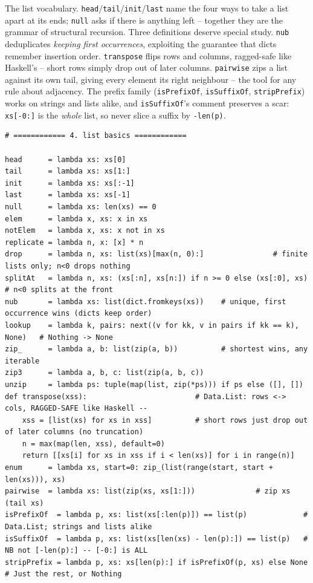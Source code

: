 \documentclass[11pt,letterpaper]{book}
\begin{document}
The list vocabulary. \texttt{head}/\texttt{tail}/\texttt{init}/\texttt{last}
name the four ways to take a list apart at its ends; \texttt{null} asks if
there is anything left -- together they are the grammar of structural
recursion. Three definitions deserve special study. \texttt{nub} deduplicates
\emph{keeping first occurrences}, exploiting the guarantee that dicts remember
insertion order. \texttt{transpose} flips rows and columns, ragged-safe like
Haskell's -- short rows simply drop out of later columns. \texttt{pairwise}
zips a list against its own tail, giving every element
its right neighbour -- the tool for any rule about adjacency. The prefix family
(\texttt{isPrefixOf}, \texttt{isSuffixOf}, \texttt{stripPrefix}) works on
strings and lists alike, and \texttt{isSuffixOf}'s comment preserves a scar:
\texttt{xs[-0:]} is the \emph{whole} list, so never slice a suffix by
\texttt{-len(p)}.
\begin{lstlisting}[style=code]
# ============ 4. list basics ============

head      = lambda xs: xs[0]
tail      = lambda xs: xs[1:]
init      = lambda xs: xs[:-1]
last      = lambda xs: xs[-1]
null      = lambda xs: len(xs) == 0
elem      = lambda x, xs: x in xs
notElem   = lambda x, xs: x not in xs
replicate = lambda n, x: [x] * n
drop      = lambda n, xs: list(xs)[max(n, 0):]                # finite lists only; n<0 drops nothing
splitAt   = lambda n, xs: (xs[:n], xs[n:]) if n >= 0 else (xs[:0], xs)   # n<0 splits at the front
nub       = lambda xs: list(dict.fromkeys(xs))    # unique, first occurrence wins (dicts keep order)
lookup    = lambda k, pairs: next((v for kk, v in pairs if kk == k), None)   # Nothing -> None
zip_      = lambda a, b: list(zip(a, b))          # shortest wins, any iterable
zip3      = lambda a, b, c: list(zip(a, b, c))
unzip     = lambda ps: tuple(map(list, zip(*ps))) if ps else ([], [])
def transpose(xss):                         # Data.List: rows <-> cols, RAGGED-SAFE like Haskell --
    xss = [list(xs) for xs in xss]          # short rows just drop out of later columns (no truncation)
    n = max(map(len, xss), default=0)
    return [[xs[i] for xs in xss if i < len(xs)] for i in range(n)]
enum      = lambda xs, start=0: zip_(list(range(start, start + len(xs))), xs)
pairwise  = lambda xs: list(zip(xs, xs[1:]))              # zip xs (tail xs)
isPrefixOf  = lambda p, xs: list(xs[:len(p)]) == list(p)             # Data.List; strings and lists alike
isSuffixOf  = lambda p, xs: list(xs[len(xs) - len(p):]) == list(p)   # NB not [-len(p):] -- [-0:] is ALL
stripPrefix = lambda p, xs: xs[len(p):] if isPrefixOf(p, xs) else None  # Just the rest, or Nothing
\end{lstlisting}
\end{document}
